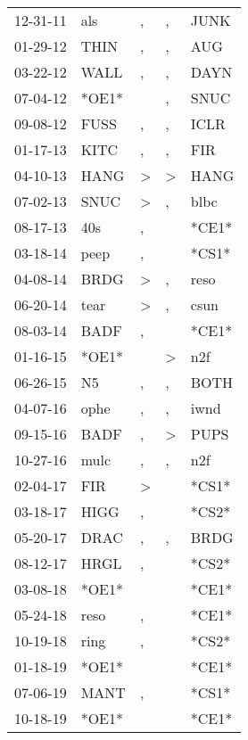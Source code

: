 \begin{supertabular}{lllll}
 12-31-11 &    als &             , &             , &   JUNK \\
 01-29-12 &   THIN &             , &             , &    AUG \\
 03-22-12 &   WALL &             , &             , &   DAYN \\
 07-04-12 &  *OE1* &               &             , &   SNUC \\
 09-08-12 &   FUSS &             , &             , &   ICLR \\
 01-17-13 &   KITC &             , &             , &    FIR \\
 04-10-13 &   HANG &  \textgreater &  \textgreater &   HANG \\
 07-02-13 &   SNUC &  \textgreater &             , &   blbc \\
 08-17-13 &    40s &             , &               &  *CE1* \\
 03-18-14 &   peep &             , &               &  *CS1* \\
 04-08-14 &   BRDG &  \textgreater &             , &   reso \\
 06-20-14 &   tear &  \textgreater &             , &   csun \\
 08-03-14 &   BADF &             , &               &  *CE1* \\
 01-16-15 &  *OE1* &               &  \textgreater &    n2f \\
 06-26-15 &     N5 &             , &             , &   BOTH \\
 04-07-16 &   ophe &             , &             , &   iwnd \\
 09-15-16 &   BADF &             , &  \textgreater &   PUPS \\
 10-27-16 &   mulc &             , &             , &    n2f \\
 02-04-17 &    FIR &  \textgreater &               &  *CS1* \\
 03-18-17 &   HIGG &             , &               &  *CS2* \\
 05-20-17 &   DRAC &             , &             , &   BRDG \\
 08-12-17 &   HRGL &             , &               &  *CS2* \\
 03-08-18 &  *OE1* &               &               &  *CE1* \\
 05-24-18 &   reso &             , &               &  *CE1* \\
 10-19-18 &   ring &             , &               &  *CS2* \\
 01-18-19 &  *OE1* &               &               &  *CE1* \\
 07-06-19 &   MANT &             , &               &  *CS1* \\
 10-18-19 &  *OE1* &               &               &  *CE1* \\
\end{supertabular}

